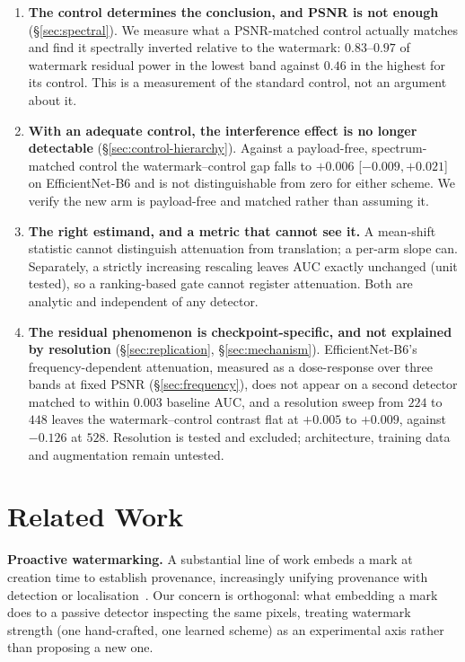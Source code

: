 \documentclass[journal]{IEEEtran}
\begin{document}
\begin{enumerate}
  \item \textbf{The control determines the conclusion, and PSNR is not enough}
        (\S\ref{sec:spectral}). We measure what a PSNR-matched control
        actually matches and find it spectrally inverted relative to the
        watermark: $0.83$--$0.97$ of watermark residual power in the lowest
        band against $0.46$ in the highest for its control. This is a
        measurement of the standard control, not an argument about it.
  \item \textbf{With an adequate control, the interference effect is no longer
        detectable}
        (\S\ref{sec:control-hierarchy}). Against a payload-free,
        spectrum-matched control the watermark--control gap falls to
        $+0.006$ [$-0.009,+0.021$] on EfficientNet-B6 and is not distinguishable
        from zero for either scheme. We verify the new arm is payload-free and
        matched rather than assuming it.
  \item \textbf{The right estimand, and a metric that cannot see it.} A
        mean-shift statistic cannot distinguish attenuation from translation;
        a per-arm slope can. Separately, a strictly increasing rescaling leaves
        AUC exactly unchanged (unit tested), so a ranking-based gate cannot
        register attenuation. Both are analytic and independent of any
        detector.
  \item \textbf{The residual phenomenon is checkpoint-specific, and not
        explained by resolution} (\S\ref{sec:replication},
        \S\ref{sec:mechanism}). EfficientNet-B6's frequency-dependent
        attenuation, measured as a dose-response over three bands at fixed
        PSNR (\S\ref{sec:frequency}),
        does not appear on a second detector matched to within $0.003$ baseline
        AUC, and a resolution sweep from $224$ to $448$ leaves the
        watermark--control contrast flat at $+0.005$ to $+0.009$, against
        $-0.126$ at $528$. Resolution is tested and excluded; architecture,
        training data and augmentation remain untested.
\end{enumerate}

\section{Related Work}
\label{sec:related}

\textbf{Proactive watermarking.} A substantial line of work embeds a mark at
creation time to establish provenance, increasingly unifying provenance with
detection or localisation~\cite{wu2026allinone,zeng2026lava}. Our concern is
orthogonal: what embedding a mark does to a passive detector inspecting the
same pixels, treating watermark strength (one hand-crafted, one learned
scheme) as an experimental axis rather than proposing a new one.
\end{document}
